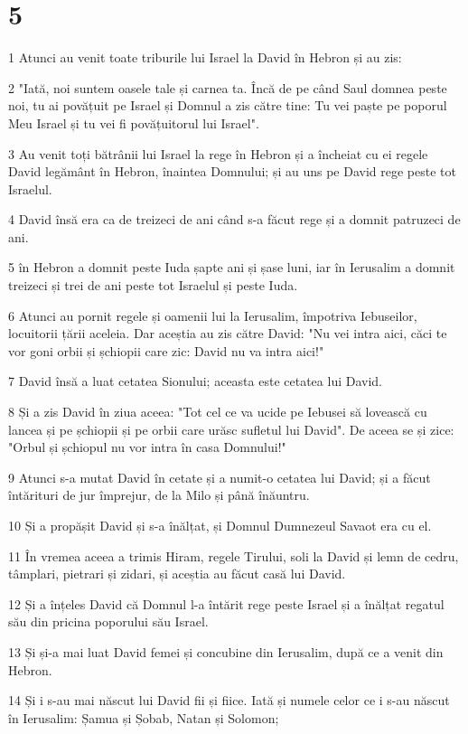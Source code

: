 \chapter{5}

\par 1 Atunci au venit toate triburile lui Israel la David în Hebron și au zis:
\par 2 "Iată, noi suntem oasele tale și carnea ta. Încă de pe când Saul domnea peste noi, tu ai povățuit pe Israel și Domnul a zis către tine: Tu vei paște pe poporul Meu Israel și tu vei fi povățuitorul lui Israel".
\par 3 Au venit toți bătrânii lui Israel la rege în Hebron și a încheiat cu ei regele David legământ în Hebron, înaintea Domnului; și au uns pe David rege peste tot Israelul.
\par 4 David însă era ca de treizeci de ani când s-a făcut rege și a domnit patruzeci de ani.
\par 5 în Hebron a domnit peste Iuda șapte ani și șase luni, iar în Ierusalim a domnit treizeci și trei de ani peste tot Israelul și peste Iuda.
\par 6 Atunci au pornit regele și oamenii lui la Ierusalim, împotriva Iebuseilor, locuitorii țării aceleia. Dar aceștia au zis către David: "Nu vei intra aici, căci te vor goni orbii și șchiopii care zic: David nu va intra aici!"
\par 7 David însă a luat cetatea Sionului; aceasta este cetatea lui David.
\par 8 Și a zis David în ziua aceea: "Tot cel ce va ucide pe Iebusei să lovească cu lancea și pe șchiopii și pe orbii care urăsc sufletul lui David". De aceea se și zice: "Orbul și șchiopul nu vor intra în casa Domnului!"
\par 9 Atunci s-a mutat David în cetate și a numit-o cetatea lui David; și a făcut întărituri de jur împrejur, de la Milo și până înăuntru.
\par 10 Și a propășit David și s-a înălțat, și Domnul Dumnezeul Savaot era cu el.
\par 11 În vremea aceea a trimis Hiram, regele Tirului, soli la David și lemn de cedru, tâmplari, pietrari și zidari, și aceștia au făcut casă lui David.
\par 12 Și a înțeles David că Domnul l-a întărit rege peste Israel și a înălțat regatul său din pricina poporului său Israel.
\par 13 Și și-a mai luat David femei și concubine din Ierusalim, după ce a venit din Hebron.
\par 14 Și i s-au mai născut lui David fii și fiice. Iată și numele celor ce i s-au născut în Ierusalim: Șamua și Șobab, Natan și Solomon;
